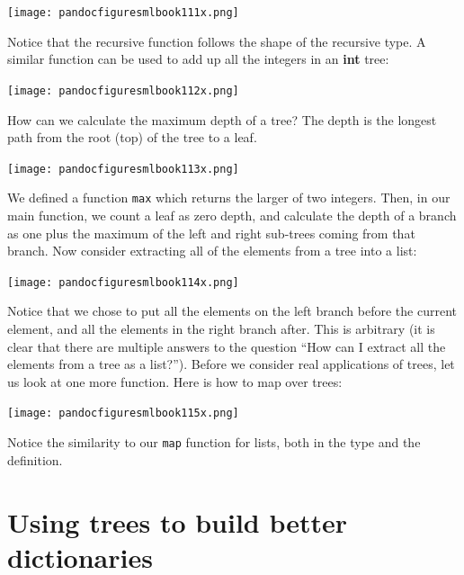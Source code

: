 \documentclass[]{book}
\begin{document}
\medskip
\begin{center}
\noindent\texttt{[image: pandocfiguresmlbook111x.png]}
\end{center}
\medskip

\noindent Notice that the recursive function follows the shape of the recursive type. A similar function can be used to add up all the integers in an \textsf{\textbf{int} tree}:

\medskip
\begin{center}
\noindent\texttt{[image: pandocfiguresmlbook112x.png]}
\end{center}
\medskip

\noindent How can we calculate the maximum depth of a tree? The depth is the longest path from the root (top) of the tree to a leaf.

\medskip
\begin{center}
\noindent\texttt{[image: pandocfiguresmlbook113x.png]}
\end{center}
\medskip

\noindent We defined a function \texttt{max} which returns the larger of two integers. Then, in our main function, we count a leaf as zero depth, and calculate the depth of a branch as one plus the maximum of the left and right sub-trees coming from that branch. Now consider extracting all of the elements from a tree into a list:

\medskip
\begin{center}
\noindent\texttt{[image: pandocfiguresmlbook114x.png]}
\end{center}
\medskip

\noindent Notice that we chose to put all the elements on the left branch before the current element, and all the elements in the right branch after. This is arbitrary (it is clear that there are multiple answers to the question ``How can I extract all the elements from a tree as a list?''). Before we consider real applications of trees, let us look at one more function. Here is how to map over trees:


\medskip
\begin{center}
\noindent\texttt{[image: pandocfiguresmlbook115x.png]}
\end{center}
\medskip

\noindent Notice the similarity to our \texttt{map} function for lists, both in the type and the definition.

\section*{Using trees to build better dictionaries}
\end{document}
